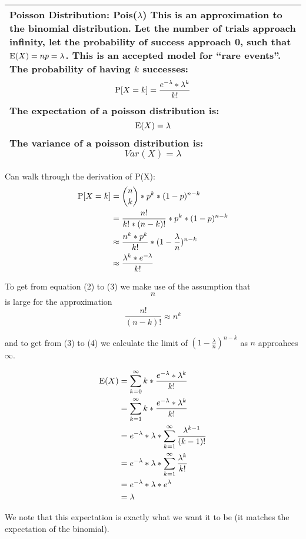 {\tabulinesep=1mm
\begin{tabu}{|p{16cm} |}
\hline
\vspace{2 mm}
\textbf{Poisson Distribution: Pois($\lambda$)}
This is an approximation to the binomial distribution. Let the number 
of trials approach infinity, let the probability of success approach 0, 
such that $\E(X) = np = \lambda$.  This is an accepted model for 
“rare events”. The probability of having $k$ successes:
\[ \P[X = k] = \frac{e^{-\lambda} * \lambda^k}{k!} \]
The expectation of a poisson distribution is:
\[ \E(X) = \lambda \]
The variance of a poisson distribution is:
\[ Var(X) = \lambda \]
\vspace{5 mm}
\\
\hline
\end{tabu}
}

\begin{solution} %
Can walk through the derivation of P(X):
\begin{align}
\P[X = k] &= {n \choose k} * p^k * (1 - p)^{n - k} \\ 
&= \frac{n!}{k! * (n - k)!} * p^k * (1 - p)^{n - k} \\
&\approx \frac{n^k * p^k}{k!} * (1 - \frac{\lambda}{n})^{n-k} \\
&\approx \frac{\lambda^k * e^{-\lambda}}{k!}
\end{align}

To get from equation (2) to (3) we make use of the assumption that $$n$$ is large for the approximation 
\[ \frac{n!}{(n-k)!} \approx n^k \] 

and to get from (3) to (4) we calculate the limit of $(1 - \frac{\lambda}{n})^{n-k}$ as $n$ approahces $\infty$.  

\begin{align*}
\E(X) &= \sum_{k = 0}^{\infty} k* \frac{e^{-\lambda} * \lambda^k}{k!} \\ \nonumber
&= \sum_{k = 1}^{\infty}k * \frac{e^{-\lambda} * \lambda^k}{k!} \\
&= e^{-\lambda} * \lambda * \sum_{k = 1}^{\infty} \frac{\lambda^{k - 1}}{(k - 1)!} \\
&=  e^{-\lambda} * \lambda * \sum_{k = 1}^{\infty} \frac{\lambda^{k}}{k!} \\
&= e^{-\lambda} * \lambda * e^{\lambda} \\
&= \lambda 
\end{align*}

We note that this expectation is exactly what we want it to be (it matches the expectation of the binomial). 

\end{solution}
